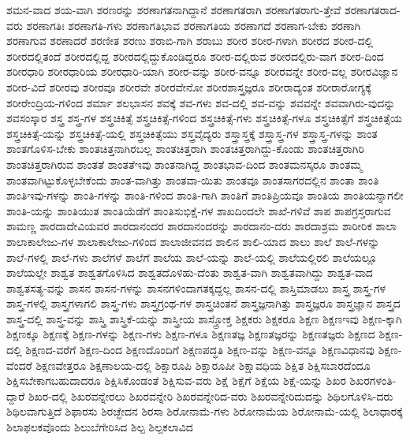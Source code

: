 {ಶಮನ-ವಾದ
ಶಯ-ವಾಗಿ
ಶರಣರನ್ನು
ಶರಣಾಗತನಾಗಿದ್ದಾನೆ
ಶರಣಾಗತರಾಗಿ
ಶರಣಾಗತರಾಗು-ತ್ತೇವೆ
ಶರಣಾಗತರಾದ-ವರು
ಶರಣಾಗತಿಃ
ಶರಣಾಗತಿ-ಗಳು
ಶರಣಾಗತಿಭಾವ
ಶರಣಾಗತಿಯ
ಶರಣಾಗದೆ
ಶರಣಾಗ-ಬೇಕು
ಶರಣಾಗಿ
ಶರಣಾಗುವ
ಶರಣಾದರೆ
ಶರಣೀತ
ಶರಣು
ಶರಾಬಿ-ಗಾಗಿ
ಶರಾಬು
ಶರೀರ
ಶರೀರ-ಗಳಾಗಿ
ಶರೀರದ
ಶರೀರ-ದಲ್ಲಿ
ಶರೀರದಲ್ಲಿತಂದೆ
ಶರೀರದಲ್ಲಿದ್ದ
ಶರೀರದಲ್ಲಿದ್ದುಕೊಂಡಿದ್ದರೂ
ಶರೀರ-ದಲ್ಲಿರುವ
ಶರೀರದಲ್ಲಿರು-ವಾಗ
ಶರೀರ-ದಿಂದ
ಶರೀರಧಾರಿ
ಶರೀರಧಾರಿಯ
ಶರೀರಧಾರಿ-ಯಾಗಿ
ಶರೀರ-ವನ್ನು
ಶರೀರ-ವನ್ನೂ
ಶರೀರವನ್ನೇ
ಶರೀರ-ವಲ್ಲ
ಶರೀರವಿಜ್ಞಾನ
ಶರೀರ-ವಿದೆ
ಶರೀರವು
ಶರೀರವೂ
ಶರೀರವೇ
ಶರೀರವೇನೋ
ಶರೀರಶಾಸ್ತ್ರಜ್ಞರೂ
ಶರೀರಾದ್ಯಂತ
ಶರೀರಾರೋಗ್ಯಕ್ಕೆ
ಶರೀರೇಂದ್ರಿಯ-ಗಳಿಂದ
ಶರ್ಮಾ
ಶಲಭಾಸನ
ಶವಕ್ಕೆ
ಶವ-ಗಳು
ಶವ-ದಲ್ಲಿ
ಶವ-ವನ್ನು
ಶವವನ್ನೇ
ಶವವಾಗಿರು-ವುದನ್ನು
ಶವಸಂಸ್ಕಾರ
ಶಸ್ತ್ರ
ಶಸ್ತ್ರ-ಗಳ
ಶಸ್ತ್ರಚಿಕಿತ್ಸೆ
ಶಸ್ತ್ರಚಿಕಿತ್ಸೆ-ಗಳಿಂದ
ಶಸ್ತ್ರಚಿಕಿತ್ಸೆ-ಗಳು
ಶಸ್ತ್ರಚಿಕಿತ್ಸೆ-ಗಳೂ
ಶಸ್ತ್ರಚಿಕಿತ್ಸೆಗೆ
ಶಸ್ತ್ರಚಿಕಿತ್ಸೆಯ
ಶಸ್ತ್ರಚಿಕಿತ್ಸೆ-ಯನ್ನು
ಶಸ್ತ್ರಚಿಕಿತ್ಸೆ-ಯಲ್ಲಿ
ಶಸ್ತ್ರಚಿಕಿತ್ಸೆಯು
ಶಸ್ತ್ರವೈದ್ಯರು
ಶಸ್ತ್ರಾಸ್ತ್ರಕ್ಕೆ
ಶಸ್ತ್ರಾಸ್ತ್ರ-ಗಳ
ಶಸ್ತ್ರಾಸ್ತ್ರ-ಗಳನ್ನು
ಶಾಂತ
ಶಾಂತಗೊಳಿಸ-ಬೇಕು
ಶಾಂತಚಿತ್ತನಾಗಿರಬಲ್ಲ
ಶಾಂತಚಿತ್ತರಾಗಿ
ಶಾಂತಚಿತ್ತರಾಗಿದ್ದು-ಕೊಂಡು
ಶಾಂತಚಿತ್ತರಾಗಿರಿ
ಶಾಂತಚಿತ್ತರಾಗಿರುವ
ಶಾಂತತೆ
ಶಾಂತತೆಇವು
ಶಾಂತನಾಗಿದ್ದ
ಶಾಂತಭಾವ-ದಿಂದ
ಶಾಂತಮನಸ್ಕರೂ
ಶಾಂತಮ್ಮ
ಶಾಂತವಾಗಿಟ್ಟುಕೊಳ್ಳಬೇಕೆಂದು
ಶಾಂತ-ವಾಗಿತ್ತು
ಶಾಂತವಾ-ಯಿತು
ಶಾಂತವೂ
ಶಾಂತಸಾಗರದಲ್ಲಿನ
ಶಾಂತಾ
ಶಾಂತಿ
ಶಾಂತಿಇವು-ಗಳನ್ನು
ಶಾಂತಿ-ಗಳನ್ನು
ಶಾಂತಿ-ಗಳಿಂದ
ಶಾಂತಿ-ಗಾಗಿ
ಶಾಂತಿಗೆ
ಶಾಂತಿಪ್ರಿಯವೂ
ಶಾಂತಿಯ
ಶಾಂತಿಯನ್ನಾಗಲೀ
ಶಾಂತಿ-ಯನ್ನು
ಶಾಂತಿಯುತ
ಶಾಂತಿಯೆಡೆಗೆ
ಶಾಂತಿಸುಭಿಕ್ಷೆ-ಗಳ
ಶಾಖದಿಂದಲೇ
ಶಾಖೆ-ಗಳಿವೆ
ಶಾಪ
ಶಾಪಗ್ರಸ್ತರಾಗುವ
ಶಾಮಣ್ಣ
ಶಾರದಾದೇವಿಯವರ
ಶಾರದಾನಂದರ
ಶಾರದಾನಂದರನ್ನು
ಶಾರದಾನಂ-ದರು
ಶಾರದಾಶ್ರಮ
ಶಾರೀರಿಕ
ಶಾಲಾ
ಶಾಲಾಕಾಲೇಜು-ಗಳ
ಶಾಲಾಕಾಲೇಜು-ಗಳಿಂದ
ಶಾಲಾಜೀವನದ
ಶಾಲಿನ
ಶಾಲಿ-ಯಾದ
ಶಾಲು
ಶಾಲೆ
ಶಾಲೆ-ಗಳನ್ನು
ಶಾಲೆ-ಗಳಲ್ಲಿ
ಶಾಲೆ-ಗಳು
ಶಾಲೆಗಳೆ
ಶಾಲೆಗೆ
ಶಾಲೆಯ
ಶಾಲೆ-ಯನ್ನು
ಶಾಲೆ-ಯಲ್ಲಿ
ಶಾಲೆಯಲ್ಲಿರಲಿ
ಶಾಲೆಯಲ್ಲೂ
ಶಾಲೆಯಲ್ಲೇ
ಶಾಶ್ವತ
ಶಾಶ್ವತಗೊಳಿಸಿದ
ಶಾಶ್ವತದೊಳಿಹು-ದೆಂತು
ಶಾಶ್ವತ-ವಾಗಿ
ಶಾಶ್ವತವಾಗಿದ್ದು
ಶಾಶ್ವತ-ವಾದ
ಶಾಶ್ವತಸತ್ಯ-ವನ್ನು
ಶಾಸನ
ಶಾಸನ-ಗಳನ್ನು
ಶಾಸನಗಳಿಂದಾಗತಕ್ಕದ್ದಲ್ಲ
ಶಾಸನ-ದಲ್ಲಿ
ಶಾಸ್ತಿಮಾಡಲು
ಶಾಸ್ತ್ರ
ಶಾಸ್ತ್ರ-ಗಳ
ಶಾಸ್ತ್ರ-ಗಳಲ್ಲಿ
ಶಾಸ್ತ್ರಗಳಾಗಲಿ
ಶಾಸ್ತ್ರ-ಗಳು
ಶಾಸ್ತ್ರಗ್ರಂಥ-ಗಳ
ಶಾಸ್ತ್ರಚಿಂತನೆ
ಶಾಸ್ತ್ರಜ್ಞನಾಗಿತ್ತು
ಶಾಸ್ತ್ರಜ್ಞರೂ
ಶಾಸ್ತ್ರಜ್ಞಾನ
ಶಾಸ್ತ್ರದ
ಶಾಸ್ತ್ರ-ದಲ್ಲಿ
ಶಾಸ್ತ್ರ-ವನ್ನು
ಶಾಸ್ತ್ರಿ
ಶಾಸ್ತ್ರಿಕೆ-ಯನ್ನು
ಶಾಸ್ತ್ರೀಯ
ಶಾಸ್ತ್ರೋಕ್ತ
ಶಿಕ್ಷಕರು
ಶಿಕ್ಷಕರೂ
ಶಿಕ್ಷಣ
ಶಿಕ್ಷಣಇವು
ಶಿಕ್ಷಣ-ಕ್ಕಾಗಿ
ಶಿಕ್ಷಣಕ್ಕೂ
ಶಿಕ್ಷಣಕ್ಕೆ
ಶಿಕ್ಷಣ-ಗಳನ್ನು
ಶಿಕ್ಷಣ-ಗಳು
ಶಿಕ್ಷಣ-ಗಳೂ
ಶಿಕ್ಷಣತಜ್ಞ
ಶಿಕ್ಷಣತಜ್ಞರನ್ನು
ಶಿಕ್ಷಣತಜ್ಞರು
ಶಿಕ್ಷಣದ
ಶಿಕ್ಷಣ-ದಲ್ಲಿ
ಶಿಕ್ಷಣದ-ವರೆಗೆ
ಶಿಕ್ಷಣ-ದಿಂದ
ಶಿಕ್ಷಣದೊಂದಿಗೆ
ಶಿಕ್ಷಣಪದ್ಧತಿ
ಶಿಕ್ಷಣ-ವನ್ನು
ಶಿಕ್ಷಣ-ವನ್ನೂ
ಶಿಕ್ಷಣವಿಧಾನವು
ಶಿಕ್ಷಣ-ವೆಂದರೆ
ಶಿಕ್ಷಣವೇತ್ತರೂ
ಶಿಕ್ಷಣಾಲಯ-ದಲ್ಲಿ
ಶಿಕ್ಷಾರೂಪಿ
ಶಿಕ್ಷಾರೂಪೀ
ಶಿಕ್ಷಾವಧಿಯ
ಶಿಕ್ಷಿತ
ಶಿಕ್ಷಿಸಬಾರದೆಂದೂ
ಶಿಕ್ಷಿಸಬೇಕಾಗಬಹುದಾದರೂ
ಶಿಕ್ಷಿಸಿಕೊಂಡಂತೆ
ಶಿಕ್ಷಿಸುವ-ವರು
ಶಿಕ್ಷೆ
ಶಿಕ್ಷೆಗೆ
ಶಿಕ್ಷೆಯ
ಶಿಕ್ಷೆ-ಯನ್ನು
ಶಿಖರ
ಶಿಖರಗಳಂತಿ-ದ್ದಾರೆ
ಶಿಖರ-ದಲ್ಲಿ
ಶಿಖರವನ್ನೇರಲು
ಶಿಖರವನ್ನೇರಿ
ಶಿಖರವನ್ನೇರಿದ-ವರು
ಶಿಖರವನ್ನೇರಿದುದನ್ನು
ಶಿಥಿಲಗೊಳಿಸಿ-ದರು
ಶಿಥಿಲವಾಗುತ್ತಿದೆ
ಶಿಫಾರಸು
ಶಿರಚ್ಛೇದನ
ಶಿರಸಾ
ಶಿರೋನಾಮೆ-ಗಳು
ಶಿರೋನಾಮೆಯ
ಶಿರೋನಾಮೆ-ಯಲ್ಲಿ
ಶಿಲಾಧಾರಕ್ಕೆ
ಶಿಲಾಫಲಕವೊಂದು
ಶಿಲುಬೆಗೇರಿಸಿದ
ಶಿಲ್ಪ
ಶಿಲ್ಪಕಲಾವಿದ
}
